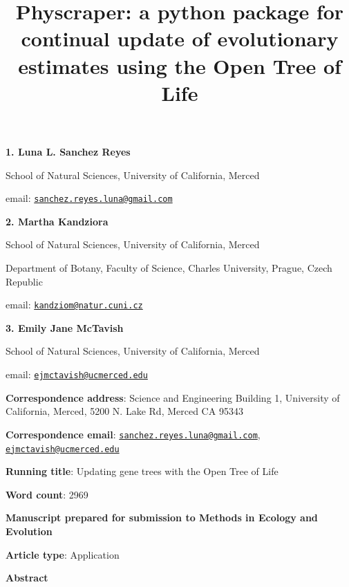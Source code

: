 \documentclass[]{article}
\title{Physcraper: a python package for continual update of evolutionary estimates using the Open Tree of Life}
\author{}
\date{\vspace{-2.5em}}
\begin{document}
\maketitle

\textbf{1. Luna L. Sanchez Reyes}

School of Natural Sciences, University of California, Merced

email: \href{mailto:sanchez.reyes.luna@gmail.com}{\nolinkurl{sanchez.reyes.luna@gmail.com}}

\textbf{2. Martha Kandziora}

School of Natural Sciences, University of California, Merced

Department of Botany, Faculty of Science, Charles University, Prague, Czech Republic

email: \href{mailto:kandziom@natur.cuni.cz}{\nolinkurl{kandziom@natur.cuni.cz}}

\textbf{3. Emily Jane McTavish}

School of Natural Sciences, University of California, Merced

email: \href{mailto:ejmctavish@ucmerced.edu}{\nolinkurl{ejmctavish@ucmerced.edu}}

\textbf{Correspondence address}: Science and Engineering Building 1, University of California, Merced, 5200 N. Lake Rd, Merced CA 95343

\textbf{Correspondence email}: \href{mailto:sanchez.reyes.luna@gmail.com}{\nolinkurl{sanchez.reyes.luna@gmail.com}}, \href{mailto:ejmctavish@ucmerced.edu}{\nolinkurl{ejmctavish@ucmerced.edu}}

\textbf{Running title}: Updating gene trees with the Open Tree of Life

\textbf{Word count}: 2969

\textbf{Manuscript prepared for submission to Methods in Ecology and Evolution}

\textbf{Article type}: Application

\newpage

\begingroup\Large

\textbf{Abstract}
\endgroup
\end{document}
